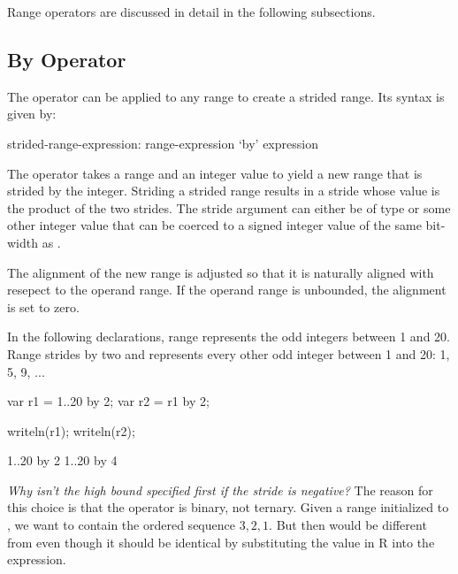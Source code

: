 Range operators are discussed in detail in the following subsections.

\subsection{By Operator}
\label{By_Operator_For_Ranges}

The  operator can be applied to any range to create a strided
range.  Its syntax is given by:
\begin{syntax}
strided-range-expression:
  range-expression `by' expression
\end{syntax}

The  operator takes a range and an integer value to yield a
new range that is strided by the integer.  Striding a strided range
results in a stride whose value is the product of the two strides.
The stride argument can either be of type  or some other
integer value that can be coerced to a signed integer value of the same
bit-width as .  

The alignment of the new range is adjusted so that it is
naturally aligned with resepect to the operand range.  If the operand range is
unbounded, the alignment is set to zero.

\begin{example}
In the following declarations, range  represents the odd integers
between 1 and 20. Range  strides  by two and represents
every other odd integer between 1 and 20: 1, 5, 9, ...
\begin{chapelpre}
\end{chapelpre}
\begin{chapel}
var r1 = 1..20 by 2;
var r2 = r1 by 2;
\end{chapel}
\begin{chapelpost}
writeln(r1);
writeln(r2);
\end{chapelpost}
\begin{chapeloutput}
1..20 by 2
1..20 by 4
\end{chapeloutput}
\end{example}

\begin{rationale}
{\it Why isn't the high bound specified first if the stride is
negative?}  The reason for this choice is that the  operator
is binary, not ternary.  Given a range  initialized
to , we want  to contain the ordered sequence
$3,2,1$.  But then  would be different from  even though it should be identical by substituting the value in
R into the expression.
\end{rationale}


